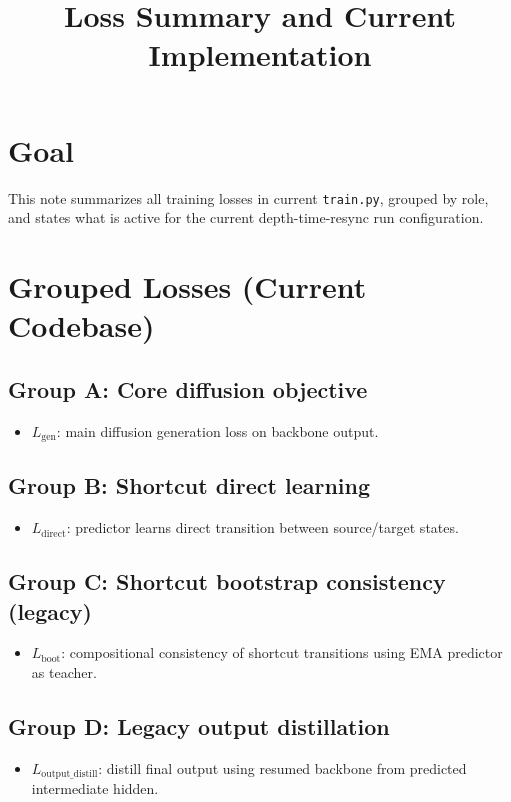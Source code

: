 \documentclass[11pt]{article}
\title{Loss Summary and Current Implementation}
\date{}
\begin{document}
\maketitle

\section{Goal}

This note summarizes all training losses in current \texttt{train.py}, grouped by role,
and states what is active for the current depth-time-resync run configuration.

\section{Grouped Losses (Current Codebase)}

\subsection*{Group A: Core diffusion objective}
\begin{itemize}[leftmargin=*]
  \item \textbf{\(L_{\text{gen}}\)}: main diffusion generation loss on backbone output.
\end{itemize}

\subsection*{Group B: Shortcut direct learning}
\begin{itemize}[leftmargin=*]
  \item \textbf{\(L_{\text{direct}}\)}: predictor learns direct transition between source/target states.
\end{itemize}

\subsection*{Group C: Shortcut bootstrap consistency (legacy)}
\begin{itemize}[leftmargin=*]
  \item \textbf{\(L_{\text{boot}}\)}: compositional consistency of shortcut transitions using EMA predictor as teacher.
\end{itemize}

\subsection*{Group D: Legacy output distillation}
\begin{itemize}[leftmargin=*]
  \item \textbf{\(L_{\text{output\_distill}}\)}: distill final output using resumed backbone from predicted intermediate hidden.
\end{itemize}
\end{document}
